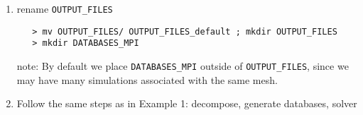 \documentclass[10pt,titlepage,fleqn]{article}
\begin{document}
\begin{enumerate}
\item rename \verb+OUTPUT_FILES+
\begin{verbatim}
   > mv OUTPUT_FILES/ OUTPUT_FILES_default ; mkdir OUTPUT_FILES
   > mkdir DATABASES_MPI
\end{verbatim}

note: By default we place \verb+DATABASES_MPI+ outside of \verb+OUTPUT_FILES+, since we may have many simulations associated with the same mesh.

\item Follow the same steps as in Example 1: decompose, generate databases, solver

\end{enumerate}


%
%

\end{document}
